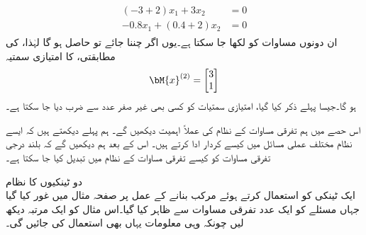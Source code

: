 \begin{gather*}
\begin{aligned}
(-3+2)x_1+3x_2&=0\\
-0.8x_1+(0.4+2)x_2&=0
\end{aligned}
\end{gather*}
ان دونوں مساوات کو  لکھا جا سکتا ہے۔یوں اگر  چننا جائے تو  حاصل ہو گا لہٰذا،  کی مطابقتی،  کا امتیازی سمتیہ 
\begin{align*}
\bM{x}^{(2)}=
\begin{bmatrix*}[r]
3\\
1
\end{bmatrix*}
\end{align*}
ہو گا۔جیسا پہلے ذکر کیا گیا، امتیازی سمتیات کو کسی  بھی غیر صفر عدد سے ضرب دیا جا سکتا ہے۔

اس حصے میں ہم  تفرقی مساوات کے نظام کی عملاً اہمیت دیکھیں گے۔ ہم پہلے دیکھتے ہیں کہ ایسے نظام مختلف عملی مسائل میں کیسے کردار ادا کرتے ہیں۔ اس کے بعد ہم دیکھیں گے کہ بلند درجی تفرقی مساوات کو کیسے تفرقی مساوات کے نظام میں تبدیل کیا جا سکتا ہے۔

\quad دو ٹینکیوں کا نظام\\
ایک ٹینکی کو استعمال کرتے ہوئے مرکب بنانے کے عمل پر صفحہ  مثال  میں غور کیا گیا جہاں مسئلے کو ایک عدد تفرقی مساوات سے ظاہر کیا گیا۔اس مثال کو ایک مرتبہ دیکھ لیں چونکہ وہی معلومات یہاں بھی استعمال کی جائیں گی۔
 
